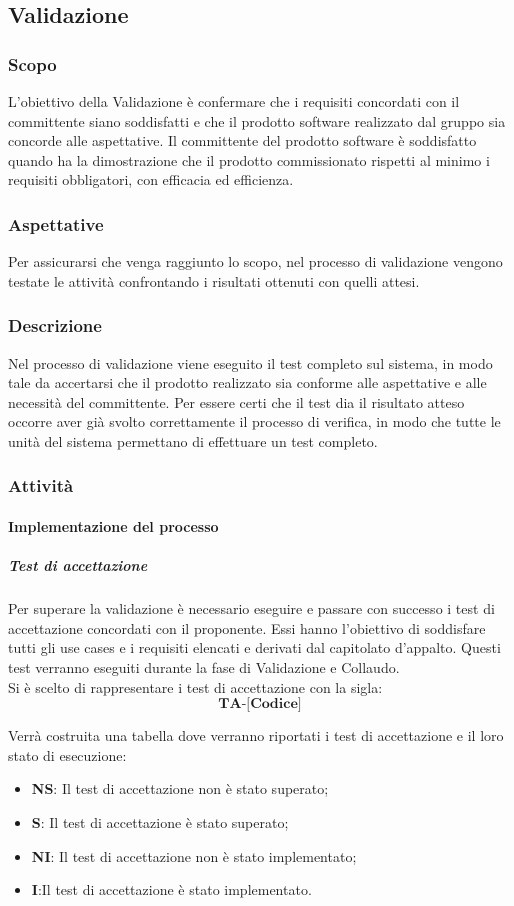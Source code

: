 \subsection{Validazione}
\subsubsection{Scopo}
L’obiettivo della Validazione è confermare che i requisiti concordati con il committente siano soddisfatti e che il prodotto software realizzato dal gruppo sia concorde alle aspettative.
Il committente del prodotto software è soddisfatto quando ha la dimostrazione che il prodotto commissionato rispetti al minimo i requisiti obbligatori, con efficacia ed efficienza.
\subsubsection{Aspettative}
Per assicurarsi che venga raggiunto lo scopo, nel processo di validazione vengono testate le attività confrontando i risultati ottenuti con quelli attesi.
\subsubsection{Descrizione}
Nel processo di validazione viene eseguito il test completo sul sistema, in modo tale da accertarsi che il prodotto realizzato sia conforme alle aspettative e alle necessità del committente. 
Per essere certi che il test dia il risultato atteso occorre aver già svolto correttamente il processo di verifica, in modo che tutte le unità del sistema permettano di effettuare un test completo.
\subsubsection{Attività}
\paragraph{Implementazione del processo}
\subparagraph*{Test di accettazione}
Per superare la validazione è necessario eseguire e passare con successo i test di accettazione concordati con il proponente. Essi hanno l'obiettivo di soddisfare tutti gli use cases e i requisiti elencati e derivati dal capitolato d'appalto. Questi test verranno eseguiti durante la fase di Validazione e Collaudo.\\
Si è scelto di rappresentare i test di accettazione con la sigla:
$$\textbf{TA-[Codice]}$$

Verrà costruita una tabella dove verranno riportati i test di accettazione e il loro stato di esecuzione:
\begin{itemize}
		\item \textbf{NS}: Il test di accettazione non è stato superato;
		\item \textbf{S}: Il test di accettazione è stato superato;
		\item \textbf{NI}: Il test di accettazione non è stato implementato;
		\item \textbf{I}:Il test di accettazione è stato implementato.
\end{itemize}

